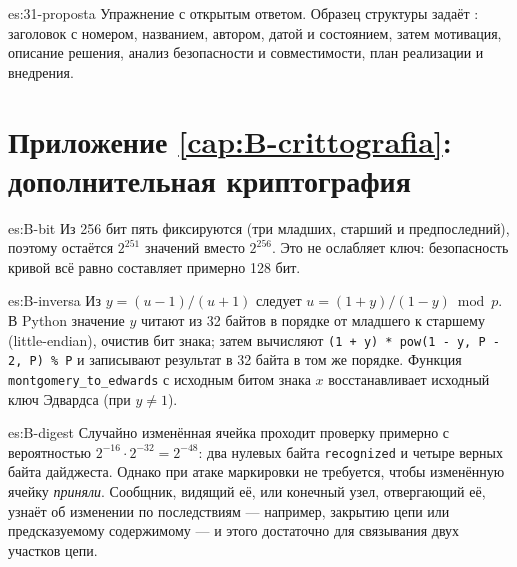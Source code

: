 \begin{soluzione}{es:31-proposta}
Упражнение с открытым ответом. Образец структуры задаёт : заголовок с номером, названием, автором, датой и состоянием, затем мотивация, описание решения, анализ безопасности и совместимости, план реализации и внедрения.
\end{soluzione}

\section*{Приложение \ref{cap:B-crittografia}: дополнительная криптография}

\begin{soluzione}{es:B-bit}
Из 256 бит пять фиксируются (три младших, старший и предпоследний), поэтому остаётся $2^{251}$ значений вместо $2^{256}$. Это не ослабляет ключ: безопасность кривой всё равно составляет примерно 128 бит.
\end{soluzione}

\begin{soluzione}{es:B-inversa}
Из $y = (u-1)/(u+1)$ следует $u = (1+y)/(1-y) \bmod p$. В Python значение $y$ читают из 32 байтов в порядке от младшего к старшему (little-endian), очистив бит знака; затем вычисляют \texttt{(1 + y) * pow(1 - y, P - 2, P) \% P} и записывают результат в 32 байта в том же порядке. Функция \texttt{montgomery\_to\_edwards} с исходным битом знака $x$ восстанавливает исходный ключ Эдвардса (при $y \neq 1$).
\end{soluzione}

\begin{soluzione}{es:B-digest}
Случайно изменённая ячейка проходит проверку примерно с вероятностью $2^{-16} \cdot 2^{-32} = 2^{-48}$: два нулевых байта \texttt{recognized} и четыре верных байта дайджеста. Однако при атаке маркировки не требуется, чтобы изменённую ячейку \emph{приняли}. Сообщник, видящий её, или конечный узел, отвергающий её, узнаёт об изменении по последствиям — например, закрытию цепи или предсказуемому содержимому — и этого достаточно для связывания двух участков цепи.
\end{soluzione}

